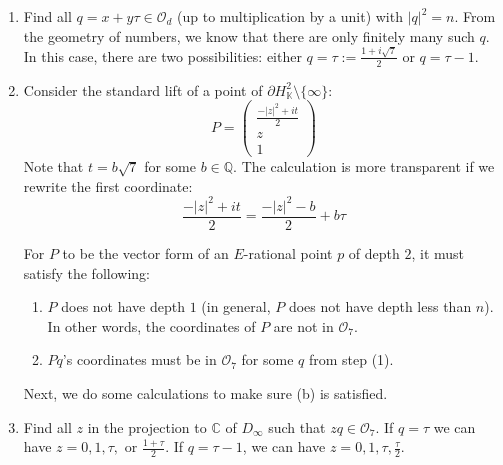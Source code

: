 \documentclass{article}[12pt]
\newcommand{\Q}{\mathbb{Q}}
\begin{document}
\begin{enumerate}

\item Find all $q = x+y\tau \in\mathcal{O}_d$ (up to multiplication by a unit) with $|q|^2 = n$.  From the geometry of numbers, we know that there are only finitely many such $q$.  In this case, there are two possibilities: either $q=\tau:=\frac{1+i\sqrt{7}}{2}$ or $q= \tau-1$.

\item Consider the standard lift  of a point of $\partial H_{\mathbb{K}}^2 \setminus \{ \infty \}$:
$$P = \left(\begin{array}{c}
\frac{-|z|^2+it}{2}\\z\\1
\end{array}\right)$$
Note that $t = b\sqrt{7}$ for some $b\in \Q$.  The calculation is more transparent if we rewrite the first coordinate:
$$\frac{-|z|^2+it}{2} = \frac{-|z|^2-b}{2}+b\tau$$

For $P$ to be the vector form of an $E$-rational point $p$ of depth $2$, it must satisfy the following:
\begin{enumerate}
\item $P$ does not have depth $1$ (in general, $P$ does not have depth less than $n$).  In other words, the coordinates of $P$ are not in $\mathcal{O}_7$.
\item $Pq$'s coordinates must be in $\mathcal{O}_7$ for some $q$ from step (1). 
\end{enumerate}
Next, we do some calculations to make sure (b) is satisfied.

\item Find all $z$ in the projection to $\mathbb{C}$ of $D_\infty$ such that $zq\in\mathcal{O}_7$.  If $q = \tau$ we can have $z = 0,1,\tau,\text{ or }\frac{1+\tau}{2}$.  If $q = \tau-1$, we can have $z = 0,1,\tau,\frac{\tau}{2}$.


\end{enumerate}
\end{document}
